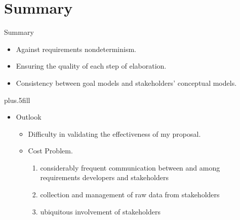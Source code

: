 \documentclass{beamer}
\begin{document}
\section*{Summary}
\begin{frame}{Summary}
  \begin{itemize}
  \item
    Against requirements nondeterminism.%
  \item
    Ensuring the quality of each step of elaboration.%
  \item 
    Consistency between goal models and stakeholders' conceptual models.%
  \end{itemize}
  \vskip0pt plus.5fill
  \begin{itemize}
  \item
    Outlook
    \begin{itemize}
    \item
      Difficulty in validating the effectiveness of my proposal.
    \item
      Cost Problem.
      \begin{enumerate}
      \item considerably frequent communication between and among requirements developers and stakeholders %
      \item collection and management of raw data from stakeholders
      \item ubiquitous involvement of stakeholders %
      \end{enumerate}
    \end{itemize}
  \end{itemize}
\end{frame}
\end{document}
